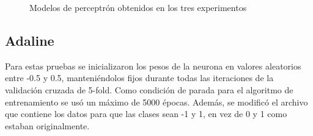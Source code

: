 \documentclass[a4paper]{article}
\begin{document}
		\begin{figure}[H]
		 \centering
		 \caption{Modelos de perceptrón obtenidos en los tres experimentos}
		 \label{f:perceptron}
		\end{figure}
	
	\subsection{Adaline}
		Para estas pruebas se inicializaron los pesos de la neurona en valores aleatorios entre -0.5 y 0.5, manteniéndolos fijos durante todas las iteraciones de la validación cruzada de 5-fold. Como condición de parada para el algoritmo de entrenamiento se usó un máximo de 5000 épocas. Además, se modificó el archivo que contiene los datos para que las clases sean -1 y 1, en vez de 0 y 1 como estaban originalmente.\\
		
\end{document}

